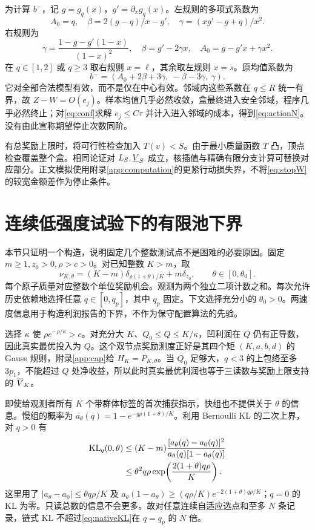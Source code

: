 为计算 $b^-$，记 $g=g_q(x)$，$g'=\partial_xg_q(x)$。左规则的多项式系数为
\[
 A_0=q,\quad \beta=2(g-q)/x-g',\quad
 \gamma=(xg'-g+q)/x^2.
\]
右规则为
\[
 \gamma=\frac{1-g-g'(1-x)}{(1-x)^2},\quad
 \beta=g'-2\gamma x,\quad A_0=g-g'x+\gamma x^2.
\]
在 $q\in[1,2]$ 或 $q\geq3$ 取右规则 $x=\ell$，其余取左规则 $x=s$。原均值系数为
\[
 b^-=(A_0+2\beta+3\gamma,\ -\beta-3\gamma,\ \gamma).
\]
它对全部合法模型有效，而不是仅在中心有效。邻域内这些系数在 $q\leq R$ 统一有界，故 $Z-W=O(e_j)$。样本均值几乎必然收敛，盒最终进入安全邻域，程序几乎必然终止；对\eqref{eq:conf}求解 $e_j\leq C\tau$ 并计入进入邻域的成本，得到\eqref{eq:actionN}。没有由此宣称期望停止次数同阶。

有总奖励上限时，将可行性检查加入 $T(v)<S$。由于最小质量函数 $T$ 凸，顶点检查覆盖整个盒。相同论证对 $L_S,\underline V_S$ 成立，核插值与精确有限分支计算可替换对应部分。正文模拟使用附录\ref{app:computation}的更紧行动损失界，不将\eqref{eq:stopW}的较宽金额差作为停止条件。

\section{连续低强度试验下的有限池下界}\label{app:continuous}
本节只证明一个构造，说明固定几个整数测试点不是困难的必要原因。固定 $m\geq1,z_0>0,\rho>c>0$。对已知整数 $K>m$，取
\[
 \nu_{K,\theta}=(K-m)\delta_{\rho(1+\theta)/K}+m\delta_{z_0},
 \qquad \theta\in[0,\theta_0].
\]
每个原子质量对应整数个单位奖励机会。观测为两个独立二项计数之和。每次允许历史依赖地选择任意 $q\in[0,q_p]$，其中 $q_p$ 固定。下文选择充分小的 $\theta_0>0$。两速度信息用于构造利润报告的下界，不作为保守配置算法的先验。

选择 $\kappa$ 使 $\rho e^{-\rho/\kappa}>c$。对充分大 $K$、$Q_0\leq Q\leq K/\kappa$，凹利润在 $Q$ 仍有正导数，因此真实最优投入为 $Q$。这个双节点奖励测度正好是其四个矩 $(K,a,b,d)$ 的 Gauss 规则，附录\ref{app:cap}给 $H_K=P_{K,\theta}$。当 $Q_0$ 足够大，$q<3$ 的上包络至多 $3p_1$，不能超过 $Q$ 处净收益，所以此时真实最优利润也等于三读数与奖励上限支持的 $\overline V_K$。

即使给观测者所有 $K$ 个带群体标签的首次捕获指示，快组也不提供关于 $\theta$ 的信息。慢组的概率为 $a_\theta(q)=1-e^{-q\rho(1+\theta)/K}$。利用 Bernoulli KL 的二次上界，对 $q>0$ 有
\begin{align}
 \operatorname{KL}_q(0,\theta)
 &\leq(K-m)\frac{[a_\theta(q)-a_0(q)]^2}{a_\theta(q)[1-a_\theta(q)]}\notag\\
 &\leq\theta^2q\rho\exp\!\left(\frac{2(1+\theta)q\rho}{K}\right).\label{eq:nativeKL}
\end{align}
这里用了 $|a_\theta-a_0|\leq\theta q\rho/K$ 及
$a_\theta(1-a_\theta)\geq(q\rho/K)e^{-2(1+\theta)q\rho/K}$；$q=0$ 的 KL 为零。只读总数的信息不会更多。故对任意连续自适应选点和至多 $N$ 条记录，链式 KL 不超过\eqref{eq:nativeKL}在 $q=q_p$ 的 $N$ 倍。

